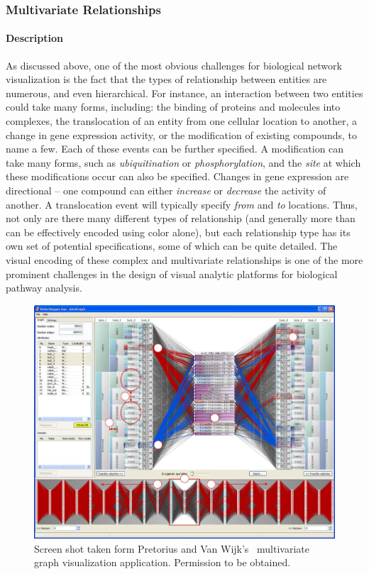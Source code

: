 \subsubsection*{Multivariate Relationships}

\paragraph*{Description}
As discussed above, one of the most obvious challenges for biological network visualization is the fact that the types of relationship between entities are numerous, and even hierarchical.
For instance, an interaction between two entities could take many forms, including: the binding of proteins and molecules into complexes, the translocation of an entity from one cellular location to another, a change in gene expression activity, or the modification of existing compounds, to name a few.
Each of these events can be further specified.
A modification can take many forms, such as \textit{ubiquitination} or \textit{phosphorylation}, and the \textit{site} at which these modifications occur can also be specified.
Changes in gene expression are directional -- one compound can either \textit{increase} or \textit{decrease} the activity of another.
A translocation event will typically specify \textit{from} and \textit{to} locations.
Thus, not only are there many different types of relationship (and generally more than can be effectively encoded using color alone), but each relationship type has its own set of potential specifications, some of which can be quite detailed.
The visual encoding of these complex and multivariate relationships is one of the more prominent challenges in the design of visual analytic platforms for biological pathway analysis.
\begin{figure}[htb]
  \centering
  \includegraphics[width=0.95\columnwidth]{figures/MultivariateViz}
  \caption{\label{fig:MultivariateViz} Screen shot taken form Pretorius and Van Wijk's~\cite{pretorius2008} multivariate graph visualization application. Permission to be obtained. }
\end{figure}

